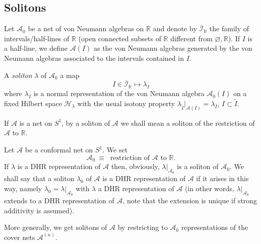 \documentclass[11pt]{article}
\def\l{\lambda}
\def\A{{\cal A}}
\def\I{{\cal I}}
\def\H{{\cal H}}
\def\emptyset{\varnothing}
\def\emptyset{\varnothing}
\def\A{{\mathcal A}}
\def\H{{\mathcal H}}
\def\I{{\mathcal I}}
\begin{document}
\subsection{Solitons}
Let $\A_0$ be a net of von Neumann algebras on $\mathbb R$ and denote by $\bar\I_{\mathbb R}$ the family of intervals/half-lines of $\mathbb R$ (open connected subsets of $\mathbb R$ different from $\emptyset , \mathbb R$). If $I$ is a half-line, we define $\A(I)$ as the von Neumann algebras generated by the von Neumann algebras associated to the intervals contained in $I$.

A \emph{soliton} $\l$ of $\A_0$ a map
\[
I\in\bar\I_{\mathbb R}\mapsto \l_I
\]
where $\l_I$ is a normal representation of the von Neumann algebra $\A_0(I)$ on a fixed Hilbert space $\H_\l$ with the usual isotony property $\l_{\tilde I}|_{\A(I)} =\l_I$, $I\subset\tilde I$.

If $\A$ is a net on $S^1$, by a soliton of $\A$ we shall mean a soliton of the restriction of $\A$ to $\mathbb R$. 

Let $\A$ be a conformal net on $S^1$. We set
\[
\text{$\A_0\ \equiv\ $ restriction of $\A$ to $\mathbb R$}. 
\]
If $\l$ is a DHR representation of $\A$ then, obviously, $\l |_{\A_0}$ is a soliton of $\A_0$. We shall say that a soliton $\l_0$ of $\A$ is a DHR representation of $\A$ if it arises in this way, namely $\l_0=\l |_{\A_0}$ with $\l$ a DHR representation of $\A$ (in other words, $\l |_{\A_0}$ extends to a DHR representation of $\A$, note that the extension is unique if strong additivity is assumed).

More generally, we get solitons of $\A$ by restricting to $\A_0$ representations of the cover nets $\A^{(n)}$.
\end{document}
